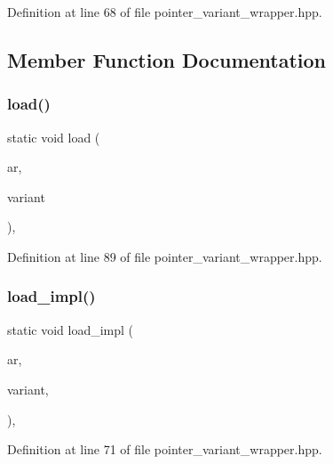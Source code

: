 Definition at line 68 of file pointer\+\_\+variant\+\_\+wrapper.\+hpp.



\subsection{Member Function Documentation}
\mbox{\label{structcereal_1_1load__visitor_ae67bead4545632528f854b076f0b00b4}} 
\subsubsection{load()}
{\footnotesize\ttfamily static void load (\begin{DoxyParamCaption}\item[{Archive \&}]{ar,  }\item[{Variant\+Type \&}]{variant }\end{DoxyParamCaption})\hspace{0.3cm}{\ttfamily [inline]}, {\ttfamily [static]}}



Definition at line 89 of file pointer\+\_\+variant\+\_\+wrapper.\+hpp.

\mbox{\label{structcereal_1_1load__visitor_aea1281669a5d8765e002bfd8ef845be7}} 
\subsubsection{load\+\_\+impl()\hspace{0.1cm}{\footnotesize\ttfamily [1/2]}}
{\footnotesize\ttfamily static void load\+\_\+impl (\begin{DoxyParamCaption}\item[{Archive \&}]{ar,  }\item[{Variant\+Type \&}]{variant,  }\item[{std\+::true\+\_\+type}]{ }\end{DoxyParamCaption})\hspace{0.3cm}{\ttfamily [inline]}, {\ttfamily [static]}}



Definition at line 71 of file pointer\+\_\+variant\+\_\+wrapper.\+hpp.



